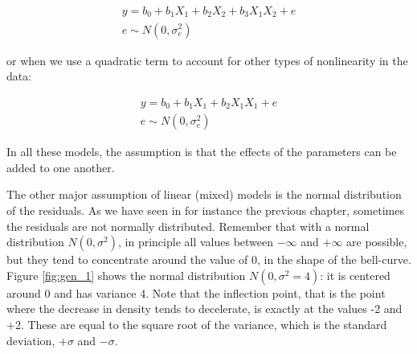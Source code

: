 \documentclass[]{book}\usepackage[]{graphicx}\usepackage[]{color}
\begin{document}
\begin{eqnarray}
y = b_0 + b_1 X_1 +  b_2 X_2 + b_3 X_1 X_2 + e \\
e \sim N(0, \sigma_e^2)
\end{eqnarray}


or when we use a quadratic term to account for other types of nonlinearity in the data:


\begin{eqnarray}
y = b_0 + b_1 X_1 +  b_2 X_1 X_1 + e \\
e \sim N(0, \sigma_e^2)
\end{eqnarray}

In all these models, the assumption is that the effects of the parameters can be added to one another.

The other major assumption of linear (mixed) models is the normal distribution of the residuals. As we have seen in for instance the previous chapter, sometimes the residuals are not normally distributed. Remember that with a normal distribution $N(0,\sigma^2)$, in principle all values between $-\infty$ and $+\infty$ are possible, but they tend to concentrate around the value of 0, in the shape of the bell-curve. Figure \ref{fig:gen_1} shows the normal distribution $N(0,\sigma^2=4)$: it is centered around 0 and has variance 4. Note that the inflection point, that is the point where the decrease in density tends to decelerate, is exactly at the values -2 and +2. These are equal to the square root of the variance, which is the standard deviation, $+\sigma$ and $-\sigma$.
\end{document}
